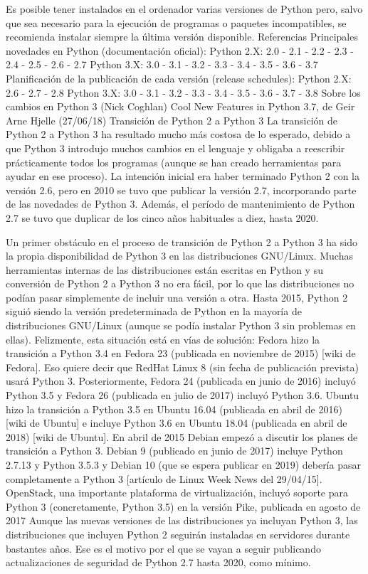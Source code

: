 \documentclass[12pt]{article}
\begin{document}
Es posible tener instalados en el ordenador varias versiones de Python pero, salvo que sea necesario para la ejecución de programas o paquetes incompatibles, se recomienda instalar siempre la última versión disponible.
Referencias
Principales novedades en Python (documentación oficial):
Python 2.X: 2.0 - 2.1 - 2.2 - 2.3 - 2.4 - 2.5 - 2.6 - 2.7
Python 3.X: 3.0 - 3.1 - 3.2 - 3.3 - 3.4 - 3.5 - 3.6 - 3.7
Planificación de la publicación de cada versión (release schedules):
Python 2.X: 2.6 - 2.7 - 2.8
Python 3.X: 3.0 - 3.1 - 3.2 - 3.3 - 3.4 - 3.5 - 3.6 - 3.7 - 3.8
Sobre los cambios en Python 3 (Nick Coghlan)
Cool New Features in Python 3.7, de Geir Arne Hjelle (27/06/18)
Transición de Python 2 a Python 3
La transición de Python 2 a Python 3 ha resultado mucho más costosa de lo esperado, debido a que Python 3 introdujo muchos cambios en el lenguaje y obligaba a reescribir prácticamente todos los programas (aunque se han creado herramientas para ayudar en ese proceso).
La intención inicial era haber terminado Python 2 con la versión 2.6, pero en 2010 se tuvo que publicar la versión 2.7, incorporando parte de las novedades de Python 3. Además, el período de mantenimiento de Python 2.7 se tuvo que duplicar de los cinco años habituales a diez, hasta 2020.

Un primer obstáculo en el proceso de transición de Python 2 a Python 3 ha sido la propia disponibilidad de Python 3 en las distribuciones GNU/Linux. Muchas herramientas internas de las distribuciones están escritas en Python y su conversión de Python 2 a Python 3 no era fácil, por lo que las distribuciones no podían pasar simplemente de incluir una versión a otra.
Hasta 2015, Python 2 siguió siendo la versión predeterminada de Python en la mayoría de distribuciones GNU/Linux (aunque se podía instalar Python 3 sin problemas en ellas). Felizmente, esta situación está en vías de solución:
Fedora hizo la transición a Python 3.4 en Fedora 23 (publicada en noviembre de 2015) [wiki de Fedora]. Eso quiere decir que RedHat Linux 8 (sin fecha de publicación prevista) usará Python 3. Posteriormente, Fedora 24 (publicada en junio de 2016) incluyó Python 3.5 y Fedora 26 (publicada en julio de 2017) incluyó Python 3.6.
Ubuntu hizo la transición a Python 3.5 en Ubuntu 16.04 (publicada en abril de 2016) [wiki de Ubuntu] e incluye Python 3.6 en Ubuntu 18.04 (publicada en abril de 2018) [wiki de Ubuntu].
En abril de 2015 Debian empezó a discutir los planes de transición a Python 3. Debian 9 (publicado en junio de 2017) incluye Python 2.7.13 y Python 3.5.3 y Debian 10 (que se espera publicar en 2019) debería pasar completamente a Python 3 [artículo de Linux Week News del 29/04/15].
OpenStack, una importante plataforma de virtualización, incluyó soporte para Python 3 (concretamente, Python 3.5) en la versión Pike, publicada en agosto de 2017
Aunque las nuevas versiones de las distribuciones ya incluyan Python 3, las distribuciones que incluyen Python 2 seguirán instaladas en servidores durante bastantes años. Ese es el motivo por el que se vayan a seguir publicando actualizaciones de seguridad de Python 2.7 hasta 2020, como mínimo.
\end{document}
